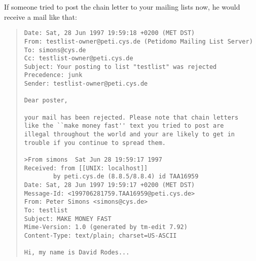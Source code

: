 \documentclass[a4paper,10pt]{scrreprt}
\begin{document}
If someone tried to post the chain letter to your mailing lists now,
he would receive a mail like that:
\begin{quote}
\begin{verbatim}
Date: Sat, 28 Jun 1997 19:59:18 +0200 (MET DST)
From: testlist-owner@peti.cys.de (Petidomo Mailing List Server)
To: simons@cys.de
Cc: testlist-owner@peti.cys.de
Subject: Your posting to list "testlist" was rejected
Precedence: junk
Sender: testlist-owner@peti.cys.de

Dear poster,

your mail has been rejected. Please note that chain letters
like the ``make money fast'' text you tried to post are
illegal throughout the world and your are likely to get in
trouble if you continue to spread them.

>From simons  Sat Jun 28 19:59:17 1997
Received: from [[UNIX: localhost]]
        by peti.cys.de (8.8.5/8.8.4) id TAA16959
Date: Sat, 28 Jun 1997 19:59:17 +0200 (MET DST)
Message-Id: <199706281759.TAA16959@peti.cys.de>
From: Peter Simons <simons@cys.de>
To: testlist
Subject: MAKE MONEY FAST
Mime-Version: 1.0 (generated by tm-edit 7.92)
Content-Type: text/plain; charset=US-ASCII

Hi, my name is David Rodes...
\end{verbatim}
\end{quote}
\end{document}
